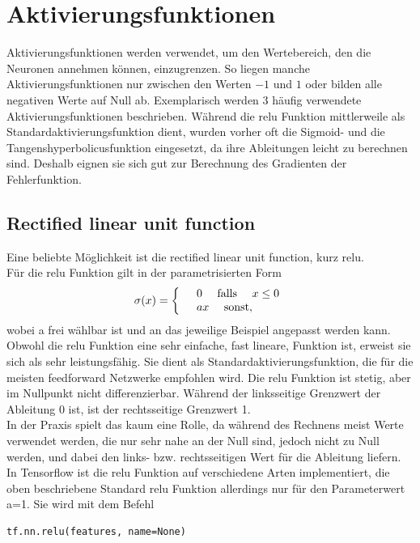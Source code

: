 \section{Aktivierungsfunktionen}
Aktivierungsfunktionen werden verwendet, um den Wertebereich, den die Neuronen annehmen k\"onnen, einzugrenzen. So liegen manche Aktivierungsfunktionen nur zwischen den Werten $-1$ und $1$ oder bilden alle negativen Werte auf Null ab. Exemplarisch werden 3 häufig verwendete Aktivierungsfunktionen beschrieben.
Während die relu Funktion mittlerweile als Standardaktivierungsfunktion dient, wurden vorher oft die Sigmoid- und die Tangenshyperbolicusfunktion eingesetzt, da ihre Ableitungen leicht zu berechnen sind. Deshalb eignen sie sich gut zur Berechnung des Gradienten der Fehlerfunktion.
\subsection{Rectified linear unit function}
Eine beliebte M\"oglichkeit ist die rectified linear unit function, kurz relu.\\
F\"ur die relu Funktion gilt in der parametrisierten Form \cite{Goodfellow}
\begin{align*}
\sigma(x)=
\left\{
\begin{array}{l l}
& 0 \quad \text{   falls  } \quad x \leq 0  \\ 
& ax \quad \text{   sonst},
\end{array}
\right.
\end{align*}
wobei a frei w\"ahlbar ist und an das jeweilige Beispiel angepasst werden kann. Obwohl die relu Funktion eine sehr einfache, fast lineare, Funktion ist, erweist sie sich als sehr leistungsf\"ahig. Sie dient als Standardaktivierungsfunktion, die f\"ur die meisten feedforward Netzwerke empfohlen wird.\cite{Goodfellow} 
Die relu Funktion ist stetig, aber im Nullpunkt nicht differenzierbar.\cite{cookbook} Während der linksseitige Grenzwert der Ableitung 0 ist, ist der rechtsseitige Grenzwert 1.\\
In der Praxis spielt das kaum eine Rolle, da während des Rechnens meist Werte verwendet werden, die nur sehr nahe an der Null sind, jedoch nicht zu Null werden, und dabei den links- bzw. rechtsseitigen Wert für die Ableitung liefern.\cite{Goodfellow} In Tensorflow ist die relu Funktion auf verschiedene Arten implementiert, die oben beschriebene Standard relu Funktion allerdings nur f\"ur den Parameterwert a=1. Sie wird mit dem Befehl \cite{cookbook}
\begin{lstlisting}
tf.nn.relu(features, name=None)
\end{lstlisting} 
